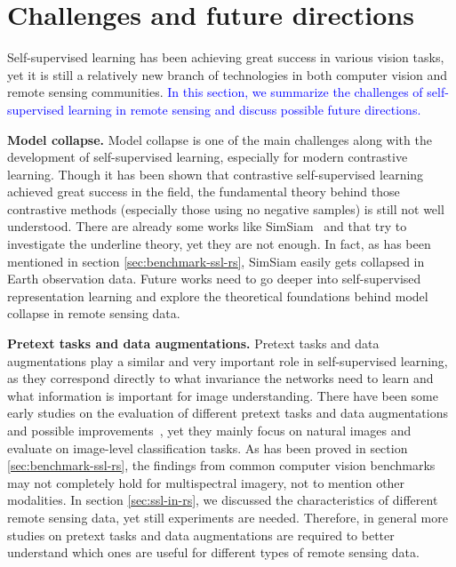 \documentclass[lettersize,journal]{IEEEtran}
\begin{document}
\section{Challenges and future directions}

Self-supervised learning has been achieving great success in various vision tasks, yet it is still a relatively new branch of technologies in both computer vision and remote sensing communities. \textcolor{blue}{In this section, we summarize the challenges of self-supervised learning in remote sensing and discuss possible future directions.}

\textbf{Model collapse.} Model collapse is one of the main challenges along with the development of self-supervised learning, especially for modern contrastive learning. Though it has been shown that contrastive self-supervised learning achieved great success in the field, the fundamental theory behind those contrastive methods (especially those using no negative samples) is still not well understood. There are already some works like SimSiam~\cite{chen2021exploring} and \cite{tian2021understanding} that try to investigate the underline theory, yet they are not enough. In fact, as has been mentioned in section \ref{sec:benchmark-ssl-rs}, SimSiam easily gets collapsed in Earth observation data. Future works need to go deeper into self-supervised representation learning and explore the theoretical foundations behind model collapse in remote sensing data. 

\textbf{Pretext tasks and data augmentations.} Pretext tasks and data augmentations play a similar and very important role in self-supervised learning, as they correspond directly to what invariance the networks need to learn and what information is important for image understanding. There have been some early studies on the evaluation of different pretext tasks and data augmentations and possible improvements~\cite{mundhenk2018improvements,ryali2021leveraging}, yet they mainly focus on natural images and evaluate on image-level classification tasks. As has been proved in section \ref{sec:benchmark-ssl-rs}, the findings from common computer vision benchmarks may not completely hold for multispectral imagery, not to mention other modalities. In section \ref{sec:ssl-in-rs}, we discussed the characteristics of different remote sensing data, yet still experiments are needed. Therefore, in general more studies on pretext tasks and data augmentations are required to better understand which ones are useful for different types of remote sensing data.
\end{document}
